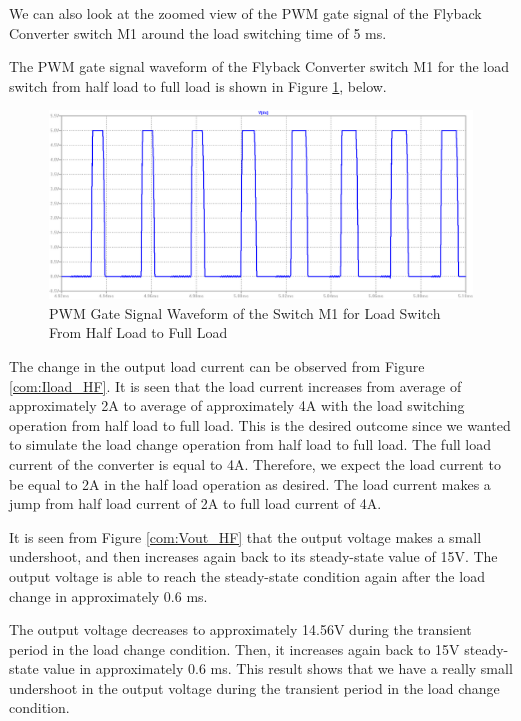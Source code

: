 We can also look at the zoomed view of the PWM gate signal of the Flyback Converter switch M1 around the load switching time of 5 ms.

The PWM gate signal waveform of the Flyback Converter switch M1 for the load switch from half load to full load is shown in Figure \ref{com:dutycycle_HF}, below.

\begin{figure}[H]
\begin{center}
\includegraphics[width=1\textwidth]{comp_simulations/dutycycle_HF.png}
\caption{PWM Gate Signal Waveform of the Switch M1 for Load Switch From Half Load to Full Load}
\label{com:dutycycle_HF}
\end{center}
\end{figure}

The change in the output load current can be observed from Figure \ref{com:Iload_HF}. It is seen that the load current increases from average of approximately 2A to average of approximately 4A with the load switching operation from half load to full load. This is the desired outcome since we wanted to simulate the load change operation from half load to full load. The full load current of the converter is equal to 4A. Therefore, we expect the load current to be equal to 2A in the half load operation as desired. The load current makes a jump from half load current of 2A to full load current of 4A.

It is seen from Figure \ref{com:Vout_HF} that the output voltage makes a small undershoot, and then increases again back to its steady-state value of 15V. The output voltage is able to reach the steady-state condition again after the load change in approximately 0.6 ms.

The output voltage decreases to approximately 14.56V during the transient period in the load change condition. Then, it increases again back to 15V steady-state value in approximately 0.6 ms. This result shows that we have a really small undershoot in the output voltage during the transient period in the load change condition.

